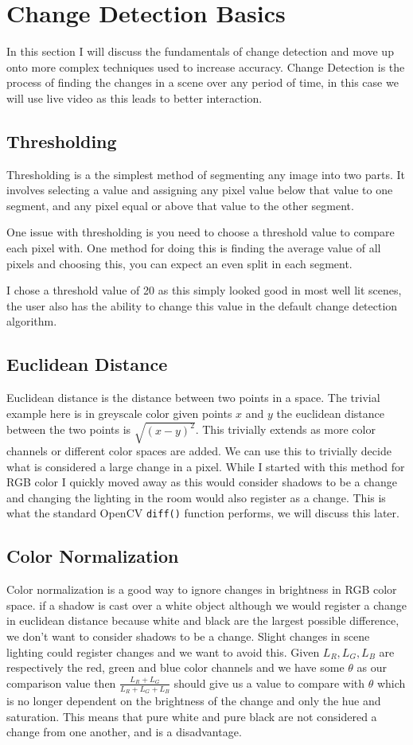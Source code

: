 \documentclass[a4paper]{report}
\begin{document}
\section{Change Detection Basics}
In this section I will discuss the fundamentals of change detection and move up onto more complex techniques used to increase accuracy. Change Detection is the process of finding the changes in a scene over any period of time, in this case we will use live video as this leads to better interaction.

\subsection{Thresholding}
Thresholding is a the simplest method of segmenting any image into two parts. It involves selecting a value and assigning any pixel value below that value to one segment, and any pixel equal or above that value to the other segment.

One issue with thresholding is you need to choose a threshold value to compare each pixel with. One method for doing this is finding the average value of all pixels and choosing this, you can expect an even split in each segment.

I chose a threshold value of 20 as this simply looked good in most well lit scenes, the user also has the ability to change this value in the default change detection algorithm.
\subsection{Euclidean Distance}
Euclidean distance is the distance between two points in a space. The trivial example here is in greyscale color given points $x$ and $y$ the euclidean distance between the two points is $\sqrt{(x-y)^2}$. This trivially extends as more color channels or different color spaces are added. We can use this to trivially decide what is considered a large change in a pixel. While I started with this method for RGB color I quickly moved away as this would consider shadows to be a change and changing the lighting in the room would also register as a change. This is what the standard OpenCV \verb|diff()| function performs, we will discuss this later.

\subsection{Color Normalization}
Color normalization is a good way to ignore changes in brightness in RGB color space. if a shadow is cast over a white object although we would register a change in euclidean distance because white and black are the largest possible difference, we don't want to consider shadows to be a change. Slight changes in scene lighting could register changes and we want to avoid this. Given $L_R,L_G,L_B$ are respectively the red, green and blue color channels and we have some $\theta$ as our comparison value then $\frac{L_R + L_G}{L_R + L_G + L_B}$ should give us a value to compare with $\theta$ which is no longer dependent on the brightness of the change and only the hue and saturation. This means that pure white and pure black are not considered a change from one another, and is a disadvantage.
\end{document}
